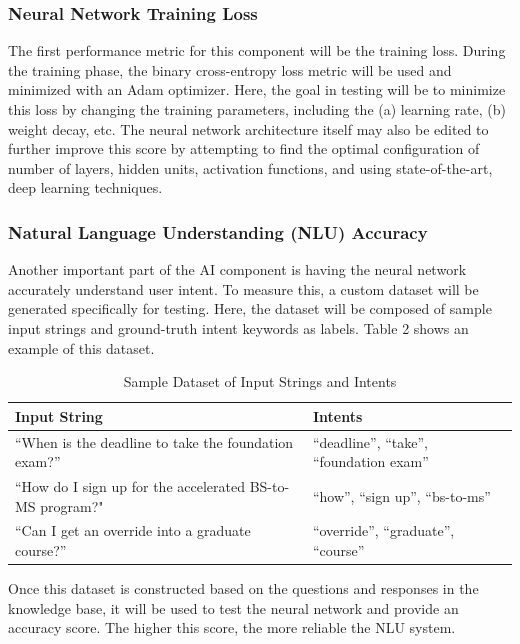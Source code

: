 \documentclass[titlepage, 12pt]{article}
\begin{document}
\subsubsection{Neural Network Training Loss}

The first performance metric for this component will be the training loss. During the training phase, the binary cross-entropy loss metric will be used and minimized with an Adam optimizer. Here, the goal in testing will be to minimize this loss by changing the training parameters, including the (a) learning rate, (b) weight decay, etc. The neural network architecture itself may also be edited to further improve this score by attempting to find the optimal configuration of number of layers, hidden units, activation functions, and using state-of-the-art, deep learning techniques.

\subsubsection{Natural Language Understanding (NLU) Accuracy}

Another important part of the AI component is having the neural network accurately understand user intent. To measure this, a custom dataset will be generated specifically for testing. Here, the dataset will be composed of sample input strings and ground-truth intent keywords as labels. Table 2 shows an example of this dataset.

\begin{center}
\begin{table}[h]
\caption{Sample Dataset of Input Strings and Intents}
    \centering
    \begin{tabular}{ L{6cm} L{6cm} }
        \toprule
        \textbf{Input String} & \textbf{Intents}
        \tabularnewline
        \midrule
        “When is the deadline to take the foundation exam?” & “deadline”, “take”, “foundation exam”
        \tabularnewline
        \midrule 
        “How do I sign up for the accelerated BS-to-MS program?" & “how”, “sign up”, “bs-to-ms”
        \tabularnewline
        \midrule
        “Can I get an override into a graduate course?” & “override”, “graduate”, “course”
        \tabularnewline
        \bottomrule
    \end{tabular}
\end{table}
\end{center}

Once this dataset is constructed based on the questions and responses in the knowledge base, it will be used to test the neural network and provide an accuracy score. The higher this score, the more reliable the NLU system.
\end{document}
